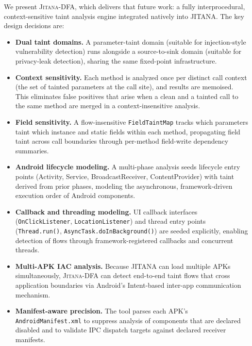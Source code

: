 \documentclass[conference]{IEEEtran}
\begin{document}
We present \textsc{Jitana-DFA}, which delivers that future work: a fully
interprocedural, context-sensitive taint analysis engine integrated natively into
JITANA. The key design decisions are:

\begin{itemize}

\item \textbf{Dual taint domains.} A parameter-taint domain (suitable for
injection-style vulnerability detection) runs alongside a source-to-sink domain
(suitable for privacy-leak detection), sharing the same fixed-point
infrastructure.

\item \textbf{Context sensitivity.} Each method is analyzed once per distinct
call context (the set of tainted parameters at the call site), and results are
memoised. This eliminates false positives that arise when a clean and a tainted
call to the same method are merged in a context-insensitive analysis.

\item \textbf{Field sensitivity.} A flow-insensitive \texttt{FieldTaintMap}
tracks which parameters taint which instance and static fields within each
method, propagating field taint across call boundaries through per-method
field-write dependency summaries.

\item \textbf{Android lifecycle modeling.} A multi-phase analysis seeds
lifecycle entry points (Activity, Service, BroadcastReceiver, ContentProvider)
with taint derived from prior phases, modeling the asynchronous,
framework-driven execution order of Android components.

\item \textbf{Callback and threading modeling.} UI callback interfaces
(\texttt{OnClickListener}, \texttt{LocationListener}) and thread entry points
(\texttt{Thread.run()}, \texttt{AsyncTask.doInBackground()}) are seeded
explicitly, enabling detection of flows through framework-registered callbacks
and concurrent threads.

\item \textbf{Multi-APK IAC analysis.} Because JITANA can load multiple APKs
simultaneously, \textsc{Jitana-DFA} can detect end-to-end taint flows that cross
application boundaries via Android's Intent-based inter-app communication
mechanism.

\item \textbf{Manifest-aware precision.} The tool parses each APK's
\texttt{AndroidManifest.xml} to suppress analysis of components that are
declared disabled and to validate IPC dispatch targets against declared receiver
manifests.

\end{itemize}
\end{document}
